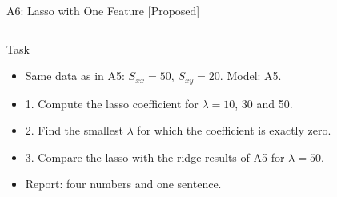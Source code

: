 \begin{frame}{A6: Lasso with One Feature [Proposed]}
\propsub
\itemsize{\scriptsize}
\begin{columns}[T]
\begin{column}{\taskw}
\begin{block}{Task}
\begin{itemize}
    \item Same data as in A5: $S_{xx} = 50$, $S_{xy} = 20$. Model: A5.
    \item 1. Compute the lasso coefficient for $\lambda = 10$, 30 and 50.
    \item 2. Find the smallest $\lambda$ for which the coefficient is exactly zero.
    \item 3. Compare the lasso with the ridge results of A5 for $\lambda = 50$.
    \item Report: four numbers and one sentence.
\end{itemize}
\end{block}
\end{column}
\begin{column}{\solw}
\end{column}
\end{columns}
\end{frame}

